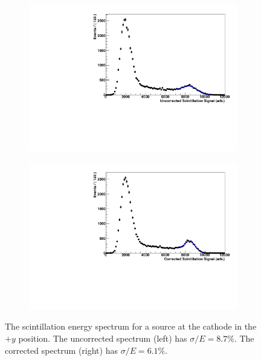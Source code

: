 \documentclass[herrin-thesis.tex]{subfiles}
\begin{document}
\begin{figure}[htbp]
\centering
\begin{subfigure}[b]{0.48\textwidth}
\centering
\includegraphics[width=\textwidth]{./plots/lightmap_spectrum_uncorrected.pdf}
\end{subfigure}\hfill%
\begin{subfigure}[b]{0.48\textwidth}
\centering
\includegraphics[width=\textwidth]{./plots/lightmap_spectrum_corrected.pdf}
\end{subfigure}
\caption[Scintillation spectrum before and after correction]{The scintillation energy spectrum for a  source at the cathode in the \(+y\) position. The uncorrected spectrum (left) has \(\sigma/E = 8.7\%\). The corrected spectrum (right) has \(\sigma/E = 6.1\%\).}
\label{fig:lightmap_improvement}
\end{figure}
\end{document}

